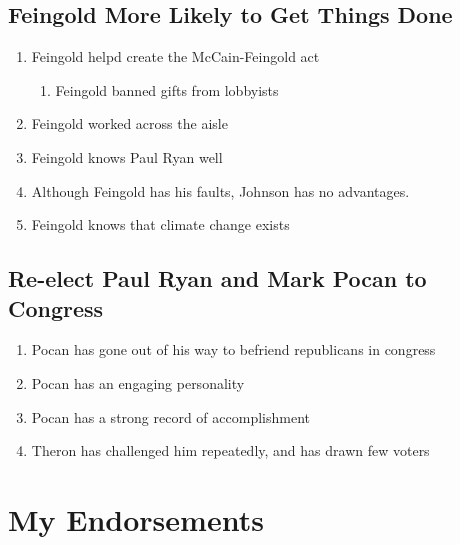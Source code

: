 \documentclass[twoside]{article}
\begin{document}
              \subsection{Feingold More Likely to Get Things Done
              }
              \begin{enumerate}[*]
                \item Feingold helpd create the McCain-Feingold act
                \begin{enumerate}[-]
                  \item Feingold banned gifts from lobbyists
                \end{enumerate}
                \item Feingold worked across the aisle
                \item Feingold knows Paul Ryan well
                \item Although Feingold has his faults, Johnson has no advantages.
                \item Feingold knows that climate change exists
              \end{enumerate}
              \subsection{Re-elect Paul Ryan and Mark Pocan to Congress
              }
              \begin{enumerate}[*]
                \item Pocan has gone out of his way to befriend republicans in congress
                \item Pocan has an engaging personality
                \item Pocan has a strong record of accomplishment
                \item Theron has challenged him repeatedly, and has drawn few voters
              \end{enumerate}
              \newpage
              \section{My Endorsements}
\end{document}

